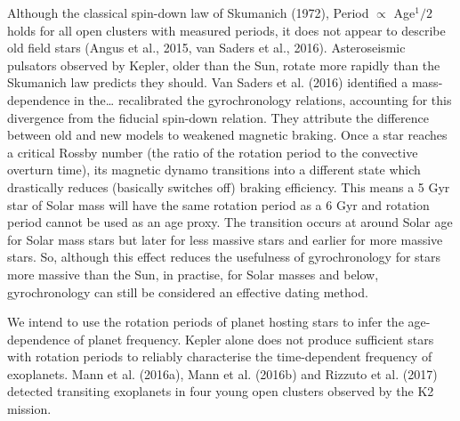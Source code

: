\documentclass[useAMS, usenatbib, preprint, 12pt]{aastex}
\begin{document}
Although the classical spin-down law of Skumanich (1972), Period $\propto$
Age$^1/2$ holds for all open clusters with measured periods, it does not
appear to describe old field stars (Angus et al., 2015, van Saders et al.,
2016).
Asteroseismic pulsators observed by Kepler, older than the Sun, rotate more
rapidly than the Skumanich law predicts they should. Van Saders et al. (2016)
identified a mass-dependence in the… recalibrated the gyrochronology
relations, accounting for this divergence from the fiducial spin-down
relation.
They attribute the difference between old and new models to weakened magnetic
braking.
Once a star reaches a critical Rossby number (the ratio of the rotation period
to the convective overturn time), its magnetic dynamo transitions into a
different state which drastically reduces (basically switches off) braking
efficiency.
This means a 5 Gyr star of Solar mass will have the same rotation period as a
6 Gyr and rotation period cannot be used as an age proxy.
The transition occurs at around Solar age for Solar mass stars but later for
less massive stars and earlier for more massive stars.
So, although this effect reduces the usefulness of gyrochronology for stars
more massive than the Sun, in practise, for Solar masses and below,
gyrochronology can still be considered an effective dating method.

We intend to use the rotation periods of planet hosting stars to infer the
age-dependence of planet frequency. Kepler alone does not produce sufficient
stars with rotation periods to reliably characterise the time-dependent
frequency of exoplanets.
Mann et al. (2016a), Mann et al. (2016b) and Rizzuto et al. (2017) detected
transiting exoplanets in four young open clusters observed by the K2 mission.
\end{document}
